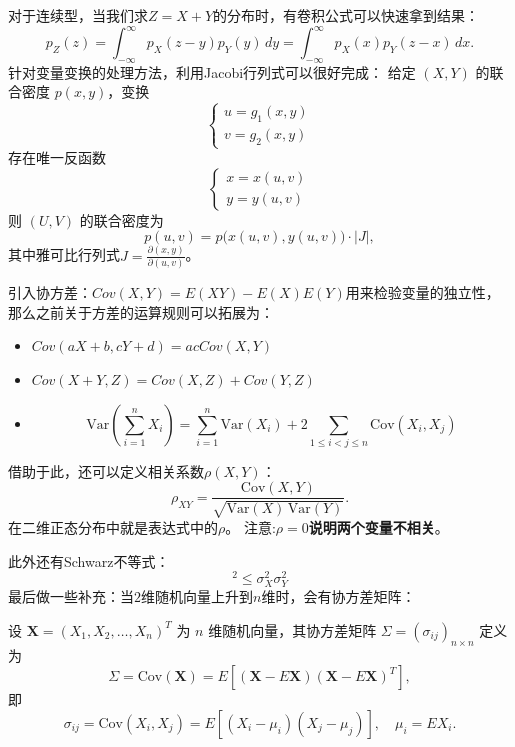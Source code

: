 \documentclass[a4paper]{ctexart}
\begin{document}
对于连续型，当我们求$Z=X+Y$的分布时，有卷积公式可以快速拿到结果：
\begin{equation}
    p_Z(z) = \int_{-\infty}^{\infty} p_X(z - y) p_Y(y) \, dy = \int_{-\infty}^{\infty} p_X(x) p_Y(z - x) \, dx.
\end{equation}
针对变量变换的处理方法，利用Jacobi行列式可以很好完成：
给定 $(X,Y)$ 的联合密度 $p(x,y)$，变换
\[
\begin{cases}
u = g_1(x,y) \\
v = g_2(x,y)
\end{cases}
\]
存在唯一反函数
\[
\begin{cases}
x = x(u,v) \\
y = y(u,v)
\end{cases}
\]
则 $(U,V)$ 的联合密度为
\[
p(u,v) = p\big(x(u,v), y(u,v)\big) \cdot |J|,
\]
其中雅可比行列式$J = \frac{\partial(x,y)}{\partial(u,v)}$。

引入协方差：$Cov(X,Y)=E(XY)-E(X)E(Y)$用来检验变量的独立性，那么之前关于方差的运算规则可以拓展为：
\begin{itemize}
    \item $Cov(aX+b,cY+d)=acCov(X,Y)$
    \item $Cov(X+Y,Z)=Cov(X,Z)+Cov(Y,Z)$
    \item 
    \[
       \mathrm{Var}\left(\sum_{i=1}^{n} X_i\right) = \sum_{i=1}^{n} \mathrm{Var}(X_i) + 2 \sum_{1 \leq i < j \leq n} \mathrm{Cov}(X_i, X_j)
    \]
\end{itemize}
借助于此，还可以定义相关系数$\rho(X,Y)$：
\[
\rho_{XY} = \frac{\mathrm{Cov}(X,Y)}{\sqrt{\mathrm{Var}(X) \, \mathrm{Var}(Y)}}.
\]
在二维正态分布中就是表达式中的$\rho$。
注意:\textbf{$\rho=0$说明两个变量不相关}。

此外还有Schwarz不等式：
\begin{equation}
    [Cov(X,Y)]^2 \leq \sigma_X^2 \sigma_Y^2
\end{equation}
最后做一些补充：当$2$维随机向量上升到$n$维时，会有协方差矩阵：

设 $\mathbf{X} = (X_1, X_2, \ldots, X_n)^T$ 为 $n$ 维随机向量，其协方差矩阵 $\Sigma = (\sigma_{ij})_{n \times n}$ 定义为
\[
\Sigma = \mathrm{Cov}(\mathbf{X}) = E\left[(\mathbf{X} - E\mathbf{X})(\mathbf{X} - E\mathbf{X})^T\right],
\]
即
\[
\sigma_{ij} = \mathrm{Cov}(X_i, X_j) = E[(X_i - \mu_i)(X_j - \mu_j)], \quad \mu_i = E X_i.
\]
\end{document}
